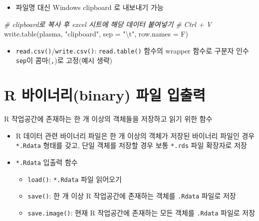 \documentclass[
  11pt,
]{krantz}
\newenvironment{Shaded}{\begin{snugshade}}{\end{snugshade}}
\newcommand{\AttributeTok}[1]{\textcolor[rgb]{0.61,0.61,0.61}{#1}}
\newcommand{\CommentTok}[1]{\textcolor[rgb]{0.37,0.37,0.37}{\textit{#1}}}
\newcommand{\FunctionTok}[1]{\textcolor[rgb]{0,0,0}{#1}}
\newcommand{\NormalTok}[1]{#1}
\newcommand{\SpecialCharTok}[1]{\textcolor[rgb]{0,0,0}{#1}}
\newcommand{\StringTok}[1]{\textcolor[rgb]{0.5,0.5,0.5}{#1}}
\providecommand{\tightlist}{%
  \setlength{\itemsep}{0pt}\setlength{\parskip}{0pt}}
\begin{document}
\normalsize

\begin{itemize}
\tightlist
\item
  파일명 대신 Windows clipboard 로 내보내기 가능
\end{itemize}

\footnotesize

\begin{Shaded}
\begin{Highlighting}[]
\CommentTok{\# clipboard로 복사 후 excel 시트에 해당 데이터 붙여넣기}
\CommentTok{\# Ctrl + V}
\FunctionTok{write.table}\NormalTok{(plasma, }\StringTok{"clipboard"}\NormalTok{, }
            \AttributeTok{sep =} \StringTok{"}\SpecialCharTok{\textbackslash{}t}\StringTok{"}\NormalTok{, }\AttributeTok{row.names =}\NormalTok{ F)}
\end{Highlighting}
\end{Shaded}

\normalsize

\begin{itemize}
\tightlist
\item
  \texttt{read.csv()}/\texttt{write.csv()}: \texttt{read.table()} 함수의 wrapper 함수로 구분자 인수 \texttt{sep}이 콤마(\texttt{,})로 고정(예시 생략)
\end{itemize}

\hypertarget{binary-import-export}{%
\section{R 바이너리(binary) 파일 입출력}\label{binary-import-export}}

R 작업공간에 존재하는 한 개 이상의 객체들을 저장하고 읽기 위한 함수

\begin{itemize}
\item
  R 데이터 관련 바이너리 파일은 한 개 이상의 객체가 저장된 바이너리 파일인 경우 \texttt{*.Rdata} 형태를 갖고, 단일 객체를 저장할 경우 보통 \texttt{*.rds} 파일 확장자로 저장
\item
  \texttt{*.Rdata} 입출력 함수

  \begin{itemize}
  \tightlist
  \item
    \texttt{load()}: \texttt{*.Rdata} 파일 읽어오기
  \item
    \texttt{save()}: 한 개 이상 R 작업공간에 존재하는 객체를 \texttt{.Rdata} 파일로 저장
  \item
    \texttt{save.image()}: 현재 R 작업공간에 존재하는 모든 객체를 \texttt{.Rdata} 파일로 저장
  \end{itemize}
\end{itemize}
\end{document}
